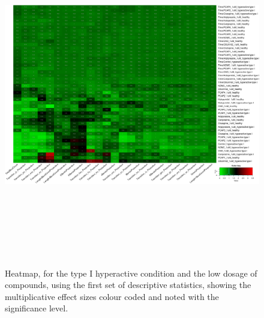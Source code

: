 \documentclass[a4paper,12pt]{article}
\begin{document}
\begin{figure}[h!]
\begin{center}
\includegraphics[width=16cm,height=15cm]{DarkApoHigh_heatmap_1_microM_DarkApoHigh_B2MAP.png}
\caption{Heatmap, for the type I hyperactive condition and the low dosage of compounds, using the first set of descriptive statistics, showing the multiplicative effect sizes colour coded and noted with the significance level.}
\end{center}
\end{figure}
\newpage
\end{document}
